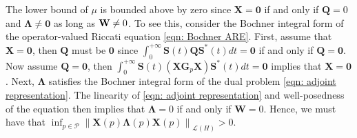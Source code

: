 \documentclass{amsart}
\newcommand{\sL}{\mathscr L}
\newcommand{\p}[1]{\left( {#1} \right)}
\newcommand{\norm}[1]{\left\| #1 \right\|}
\newcommand{\sP}{\mathcal{P}}
\newcommand{\bX}{\mathbf X}
\newcommand{\bQ}{\mathbf Q}
\newcommand{\bG}{\mathbf G}
\newcommand{\bS}{\mathbf S}
\newcommand{\bLambda}{\boldsymbol{\Lambda}}
\newcommand{\bW}{\mathbf W}
\begin{document}
The lower bound of $\mu$ is bounded above by zero since $\bX = \mathbf 0$ if and only if $\bQ = 0$ and $\bLambda \neq \mathbf 0$ as long as $\bW \neq \mathbf \mathbf 0$. To see this, consider the Bochner integral form of the operator-valued Riccati equation \eqref{eqn: Bochner ARE}. First, assume that $\bX = \mathbf 0$, then $\bQ$ must be $\mathbf 0$ since $\int_0^{+\infty}\bS(t)\bQ\bS^*(t)dt=\mathbf 0$ if and only if $\bQ = \mathbf 0$. Now assume $\bQ = \mathbf 0$, then $\int_0^{+\infty}\bS(t)\p{\bX\bG_p\bX}\bS^*(t)dt = \mathbf 0$ implies that $\bX = \mathbf 0$. Next, $\bLambda$ satisfies the Bochner integral form of the dual problem \eqref{eqn: adjoint representation}. The linearity of \eqref{eqn: adjoint representation} and well-posedness of the equation then implies that $\bLambda = 0$ if and only if $\bW = 0$. Hence, we must have that $\inf_{p\in\sP} \norm{\bX(p)\bLambda(p)\bX(p)}_{\sL\p{H}} > 0.$
\end{document}
